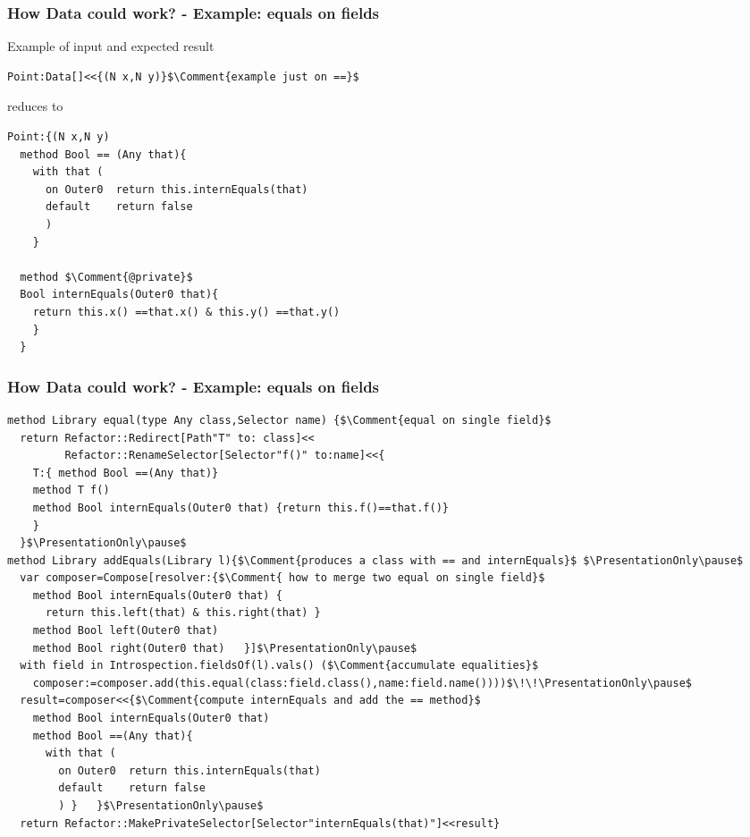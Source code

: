\begin{frame}[fragile]
\frametitle{How Data could work? - Example: equals on fields}
Example of input and expected result
\begin{NiceCode}{59ex}{0.76}
\begin{lstlisting}
Point:Data[]<<{(N x,N y)}$\Comment{example just on ==}$
\end{lstlisting}
\end{NiceCode}
reduces to
\begin{NiceCode}{59ex}{0.76}
\begin{lstlisting}
Point:{(N x,N y)
  method Bool == (Any that){
    with that (
      on Outer0  return this.internEquals(that) 
      default    return false 
      )
    }

  method $\Comment{@private}$
  Bool internEquals(Outer0 that){
    return this.x() ==that.x() & this.y() ==that.y()
    }
  }
\end{lstlisting}
\end{NiceCode}

\end{frame}


\begin{frame}[fragile]
\frametitle{How Data could work? - Example: equals on fields}
\begin{NiceCode}{59ex}{0.74}
\begin{lstlisting}
method Library equal(type Any class,Selector name) {$\Comment{equal on single field}$
  return Refactor::Redirect[Path"T" to: class]<<
         Refactor::RenameSelector[Selector"f()" to:name]<<{
    T:{ method Bool ==(Any that)}
    method T f()
    method Bool internEquals(Outer0 that) {return this.f()==that.f()}
    }  
  }$\PresentationOnly\pause$
method Library addEquals(Library l){$\Comment{produces a class with == and internEquals}$ $\PresentationOnly\pause$
  var composer=Compose[resolver:{$\Comment{ how to merge two equal on single field}$
    method Bool internEquals(Outer0 that) {
      return this.left(that) & this.right(that) }
    method Bool left(Outer0 that)
    method Bool right(Outer0 that)   }]$\PresentationOnly\pause$
  with field in Introspection.fieldsOf(l).vals() ($\Comment{accumulate equalities}$
    composer:=composer.add(this.equal(class:field.class(),name:field.name())))$\!\!\PresentationOnly\pause$
  result=composer<<{$\Comment{compute internEquals and add the == method}$
    method Bool internEquals(Outer0 that)
    method Bool ==(Any that){
      with that (
        on Outer0  return this.internEquals(that)
        default    return false
        ) }   }$\PresentationOnly\pause$
  return Refactor::MakePrivateSelector[Selector"internEquals(that)"]<<result}
\end{lstlisting}
\end{NiceCode}
\end{frame}


